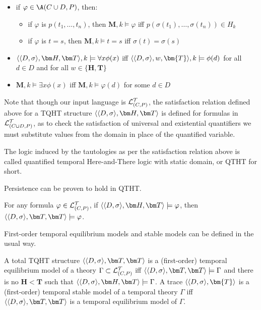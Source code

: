 \begin{itemize}
  \item if $\varphi \in \A(C \cup D,P)$, then:
    \begin{itemize}
    \item if $\varphi$ is $p(t_1,\dots,t_n)$, then $\bm{M},k \models \varphi$ iff $p(\sigma(t_1), \dots, \sigma(t_n))\in H_k$
    \item if $\varphi$ is $t = s$, then  $\bm{M},k \models t = s$ iff $\sigma(t) = \sigma(s)$
    \end{itemize}
  \item $\qthandt,k \models \forall x \phi(x)$ iff $\langle \dsigma, w,\bm{T} \rangle,k \models \phi(d)$ for all $d \in D$ and for all $w \in \{\bm{H}, \bm{T}\}$
  \item $\bm{M},k \models \exists x \phi(x)$ iff $\bm{M},k \models \varphi(d)$ for some $d \in D$
  \end{itemize}
Note that though our input language is $\mathcal{L}_{(C,P)}^\mathcal{T}$, the satisfaction
relation defined above for a TQHT structure $\qthandt$ is defined for
formulas in $\mathcal{L}_{(C \cup D,P)}^\mathcal{T}$, as to check the satisfaction of universal and
existential quantifiers we must substitute values from the domain in
place of the quantified variable.

The logic induced by the tautologies as per the satisfaction relation
above is called quantified temporal Here-and-There logic with static
domain, or QTHT for short.

Persistence can be proven to hold in QTHT.

\begin{proposition}
  For any formula $\varphi \in \mathcal{L}_{(C,P)}^\mathcal{T}$, if $\qthandt \models \varphi$, then
  $\qttandt \models \varphi$.
\end{proposition}

First-order temporal equilibrium models and stable models can be defined in the usual way.

\begin{definition}
  A total TQHT structure $\qttandt$ is a (first-order) temporal
  equilibrium model of a theory $\Gamma \subset \mathcal{L}_{(C,P)}^\mathcal{T}$ iff
  $\qttandt \models \Gamma$ and there is no $\bm{H} < \bm{T}$ such
  that $\qthandt \models \Gamma$. A trace
  $\langle \dsigma, \bm{T} \rangle$ is a (first-order) temporal stable
  model of a temporal theory $\Gamma$ iff $\qttandt$ is a temporal
  equilibrium model of $\Gamma$.
\end{definition}

